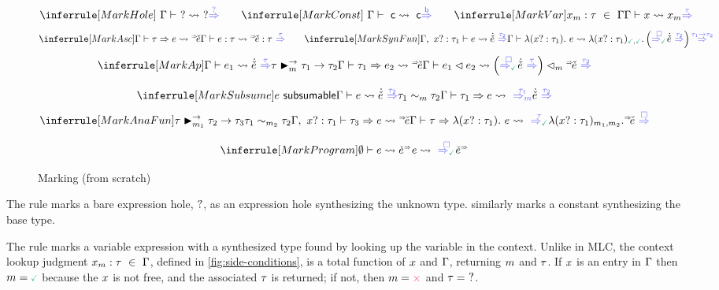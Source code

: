 \begin{figure}
    \centering

    \judgbox{\MarkSyn{\BEV}{\MEUV}}
    \[
    \MarkHole\hspace{20pt}\MarkConst\hspace{20pt}\MarkVar
    \]
    \[
    \MarkAsc\hspace{20pt}\MarkSynFun
    \]
    \[
    \MarkAp
    \]  

    \vspace{5pt}
    \judgbox{\MarkAna{\TV}{\BEV}{\MEUV}}
    \[
    \MarkSubsume
    \]
    \[
    \MarkAnaFun
    \]

    \vspace{5pt}
    \judgbox{\MarkProg{\BEV}{\MPV}}
    \[
    \MarkProgram
    \]
    \vspace{-10pt}
    \caption{Marking (from scratch)}
    \label{fig:marking}
\end{figure}

The  rule marks a bare expression hole, $?$, as an expression hole synthesizing the unknown type.  similarly marks a constant synthesizing the base type. 

The  rule marks a variable expression with a synthesized type found by looking up the variable in the context. Unlike in MLC, the context lookup judgment $x_{m} : \tau~\in~\Gamma$, defined in \autoref{fig:side-conditions}, is a total function of $x$ and $\Gamma$, returning $m$ and $\tau$. If $x$ is an entry in $\Gamma$ then $\MV=\MGood$ because the $x$ is not free, and the associated $\tau$ is returned; if not, then $\MV=\MBad$ and $\tau=~?$.

